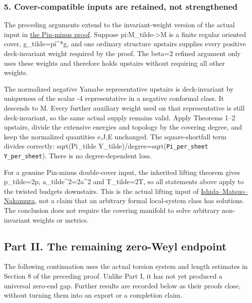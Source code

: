 \documentclass[
  10pt,
]{article}
\begin{document}
\hypertarget{cover-compatible-inputs-are-retained-not-strengthened}{%
\subsubsection{5. Cover-compatible inputs are retained, not
strengthened}\label{cover-compatible-inputs-are-retained-not-strengthened}}

The preceding arguments extend to the invariant-weight version of the
actual input in
\href{../mathematics/current/round14_twisted_rigidity.md}{the Pin-minus
proof}. Suppose pi:M\_tilde-\textgreater M is a finite regular oriented
cover, g\_tilde=pi\^{}*g, and one ordinary structure upstairs supplies
every positive deck-invariant weight required by the proof. The beta=2
refined argument only uses these weights and therefore holds upstairs
without requiring all other weights.

The normalized negative Yamabe representative upstairs is deck-invariant
by uniqueness of the scalar -4 representative in a negative conformal
class. It descends to M. Every further auxiliary weight used on that
representative is still deck-invariant, so the same actual supply
remains valid. Apply Theorems 1--2 upstairs, divide the extensive
energies and topology by the covering degree, and keep the normalized
quantities e,J,E unchanged. The square-shortfall term divides correctly:
sqrt(Pi\_tilde Y\_tilde)/degree=sqrt(\nolinkurl{Pi_per_sheet} \nolinkurl{Y_per_sheet}).
There is no degree-dependent loss.

For a genuine Pin-minus double-cover input, the inherited lifting
theorem gives p\_tilde=2p, a\_tilde\^{}2=2a\^{}2 and T\_tilde=2T, so all
statements above apply to the twisted budgets downstairs. This is the
actual lifting input of
\href{https://arxiv.org/pdf/1505.05948}{Ishida--Matsuo--Nakamura}, not a
claim that an arbitrary formal local-system class has solutions. The
conclusion does not require the covering manifold to solve arbitrary
non-invariant weights or metrics.

\hypertarget{part-ii.-the-remaining-zero-weyl-endpoint}{%
\subsection{Part II. The remaining zero-Weyl
endpoint}\label{part-ii.-the-remaining-zero-weyl-endpoint}}

The following continuation uses the actual torsion system and length
estimates in Section 8 of the preceding proof. Unlike Part I, it has not
yet produced a universal zero-end gap. Further results are recorded
below as their proofs close, without turning them into an export or a
completion claim.
\end{document}
